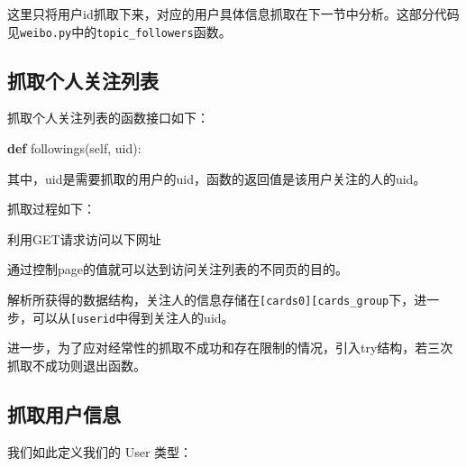 \documentclass[a4paper,UTF8]{ctexart}
\newenvironment{Shaded}{}{}
\newcommand{\KeywordTok}[1]{\textcolor[rgb]{0.00,0.44,0.13}{\textbf{{#1}}}}
\newcommand{\SpecialCharTok}[1]{\textcolor[rgb]{0.25,0.44,0.63}{{#1}}}
\newcommand{\StringTok}[1]{\textcolor[rgb]{0.25,0.44,0.63}{{#1}}}
\newcommand{\VariableTok}[1]{\textcolor[rgb]{0.10,0.09,0.49}{{#1}}}
\newcommand{\OperatorTok}[1]{\textcolor[rgb]{0.40,0.40,0.40}{{#1}}}
\newcommand{\NormalTok}[1]{{#1}}
\begin{document}
这里只将用户id抓取下来，对应的用户具体信息抓取在下一节中分析。这部分代码见\texttt{weibo.py}中的\texttt{topic\_followers}函数。

\subsection{抓取个人关注列表}\label{ux6293ux53d6ux4e2aux4ebaux5173ux6ce8ux5217ux8868}

抓取个人关注列表的函数接口如下：

\begin{Shaded}
\begin{Highlighting}[]
\KeywordTok{def} \NormalTok{followings(}\VariableTok{self}\NormalTok{, uid):}
\end{Highlighting}
\end{Shaded}

其中，uid是需要抓取的用户的uid，函数的返回值是该用户关注的人的uid。

抓取过程如下：

利用GET请求访问以下网址

\begin{Shaded}
\end{Shaded}

通过控制page的值就可以达到访问关注列表的不同页的目的。

解析所获得的数据结构，关注人的信息存储在\texttt{{[}\textquotesingle{}cards\textquotesingle{}{]}{[}0{]}{[}\textquotesingle{}cards\_group\textquotesingle{}{]}}下，进一步，可以从\texttt{{[}\textquotesingle{}user\textquotesingle{}{]}{[}\textquotesingle{}id\textquotesingle{}{]}}中得到关注人的uid。

进一步，为了应对经常性的抓取不成功和存在限制的情况，引入try结构，若三次抓取不成功则退出函数。

\subsection{抓取用户信息}\label{ux6293ux53d6ux7528ux6237ux4fe1ux606f}

我们如此定义我们的 User 类型：
\end{document}
